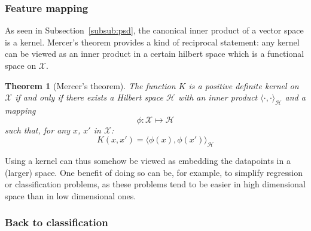 \documentclass[a4paper, 11pt]{article}
\newtheorem{theorem}{Theorem}
\begin{document}
\subsubsection{Feature mapping}
\label{map}
As seen in Subsection~\ref{subsub:psd}, the canonical inner
product of a vector space is a kernel. Mercer's theorem provides
a kind of reciprocal statement: any kernel can be viewed as an
inner product in a certain hilbert space which is a functional
space on $\mathcal{X}$.
\begin{theorem} [Mercer's theorem]
The function $K$ is a positive definite kernel on $\mathcal{X}$ if and only
if there exists a Hilbert space $\mathcal{H}$ with an inner product $\langle
\cdot,\cdot\rangle_{\mathcal{H}}$ and a mapping
\begin{equation}
  \phi: \mathcal{X}\mapsto\mathcal{H}
\end{equation}
such that, for any $x$, $x'$ in $\mathcal{X}$:
\begin{equation}
  K(x,x') = \langle\phi(x),\phi(x')\rangle_{\mathcal{H}}
\end{equation}
\end{theorem}
Using a kernel can thus somehow be viewed as embedding the datapoints in
a (larger) space. One benefit of doing so can be, for example, to simplify
regression or classification problems, as these problems tend to
be easier in high dimensional space than in low dimensional ones.

\subsubsection{Back to classification}
\end{document}
